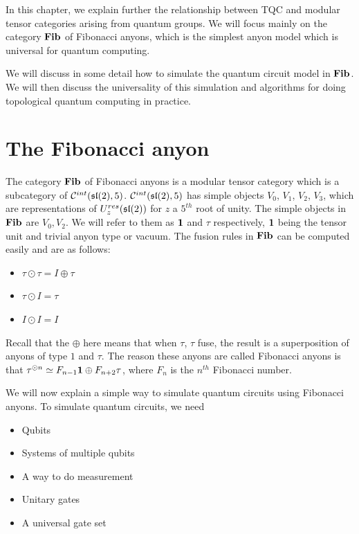 In this chapter, we explain further the relationship between TQC and modular tensor
categories arising from quantum groups. We will focus mainly on the category
$\mathbf{Fib}$ of Fibonacci anyons, which is the simplest anyon model which is universal for
quantum computing. 

We will discuss in some detail how to simulate the quantum
circuit model in $\mathbf{Fib}$. We will then discuss the universality of this
simulation and algorithms for doing topological quantum computing in practice.

\section{The Fibonacci anyon}
The category $\mathbf{Fib}$ of Fibonacci anyons is a modular tensor category which is a
subcategory of $\mathcal{C}^{int}(\mathfrak{sl}(2),5)$. $\mathcal{C}^{int}(\mathfrak{sl}(2),5)$
has simple objects $V_0$, $V_1$, $V_2$, $V_3$, which are representations of
$U_z^{res}(\mathfrak{sl}(2))$ for $z$ a $5^{th}$ root of unity. The simple objects in 
$\mathbf{Fib}$ are $V_0, V_2$. We will refer to them as $\mathbf{1}$ and $\tau$
respectively, $\mathbf{1}$ being the tensor unit and trivial anyon type or vacuum. The
fusion rules in $\mathbf{Fib}$ can be computed easily and are as follows:

\begin{itemize}
    \item $\tau \odot \tau = I \oplus \tau$
    \item $\tau \odot I = \tau$
    \item $I \odot I = I$
\end{itemize}

Recall that the $\oplus$ here means that when $\tau$, $\tau$ fuse, the result
is a superposition of anyons of type $1$ and $\tau$.  The reason these anyons are
called Fibonacci anyons is that $\tau^{\odot n} \simeq F_{n-1} \mathbf{1} \oplus F_{n+2}
\tau$, where $F_n$ is the $n^{th}$ Fibonacci number.

We will now explain a simple way to simulate quantum circuits using Fibonacci
anyons. To simulate quantum circuits, we need

\begin{itemize}
\item Qubits
\item Systems of multiple qubits
\item A way to do measurement
\item Unitary gates
\item A universal gate set
\end{itemize}

